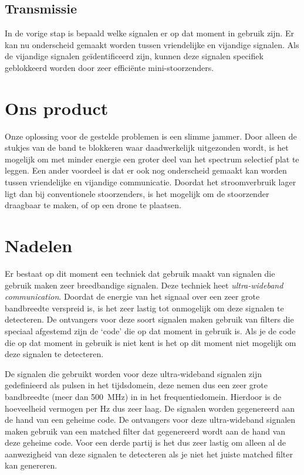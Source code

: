 \documentclass[oneside, a4paper, openany]{memoir}
\begin{document}
\subsection{Transmissie}
In de vorige stap is bepaald welke signalen er op dat moment in gebruik zijn. Er kan nu onderscheid gemaakt worden tussen vriendelijke en vijandige signalen. Als de vijandige signalen geïdentificeerd zijn, kunnen deze signalen specifiek geblokkeerd worden door zeer efficiënte mini-stoorzenders.

\section{Ons product}
Onze oplossing voor de gestelde problemen is een slimme jammer. Door alleen de stukjes van de band te blokkeren waar daadwerkelijk uitgezonden wordt, is het mogelijk om met minder energie een groter deel van het spectrum selectief plat te leggen. Een ander voordeel is dat er ook nog onderscheid gemaakt kan worden tussen vriendelijke en vijandige communicatie. Doordat het stroomverbruik lager ligt dan bij conventionele stoorzenders, is het mogelijk om de stoorzender draagbaar te maken, of op een drone te plaatsen.

\section{Nadelen}
Er bestaat op dit moment een techniek dat gebruik maakt van signalen die gebruik maken zeer breedbandige signalen. Deze techniek heet \textit{ultra-wideband communication}. Doordat de energie van het signaal over een zeer grote bandbreedte verspreid is, is het zeer lastig tot onmogelijk om deze signalen te detecteren. De ontvangers voor deze soort signalen maken gebruik van filters die speciaal afgestemd zijn de `code' die op dat moment in gebruik is. Als je de code die op dat moment in gebruik is niet kent is het op dit moment niet mogelijk om deze signalen te detecteren.

\begin{blockDetail}
De signalen die gebruikt worden voor deze ultra-wideband signalen zijn gedefinieerd als pulsen in het tijdsdomein, deze nemen dus een zeer grote bandbreedte (meer dan \SI{500}{\mega\hertz}) in in het frequentiedomein. Hierdoor is de hoeveelheid vermogen per \si{\hertz} dus zeer laag. De signalen worden gegenereerd aan de hand van een geheime code. De ontvangers voor deze ultra-wideband signalen maken gebruik van een matched filter dat gegenereerd wordt aan de hand van deze geheime code. Voor een derde partij is het dus zeer lastig om alleen al de aanwezigheid van deze signalen te detecteren als je niet het juiste matched filter kan genereren.
\end{blockDetail}
\end{document}
